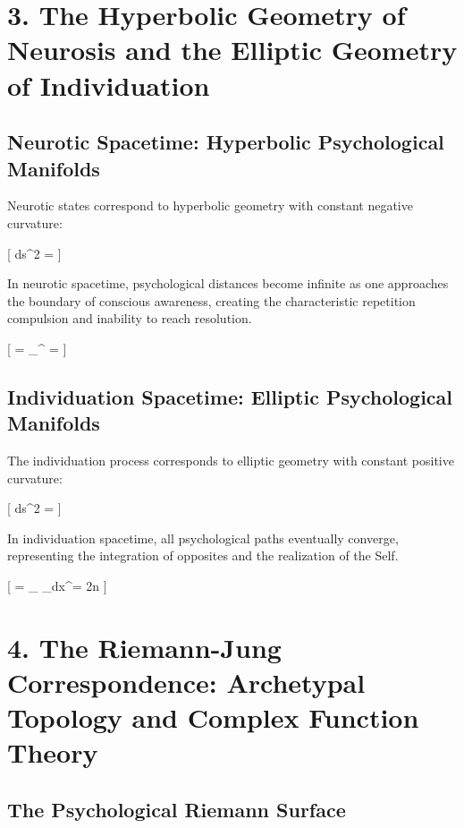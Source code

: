 \documentclass[12pt]{article}
\begin{document}
\section*{3. The Hyperbolic Geometry of Neurosis and the Elliptic Geometry of Individuation}

\subsection*{Neurotic Spacetime: Hyperbolic Psychological Manifolds}

Neurotic states correspond to hyperbolic geometry with constant negative curvature:

[
ds^2 =  \quad {}
]

In neurotic spacetime, psychological distances become infinite as one approaches the boundary of conscious awareness, creating the characteristic repetition compulsion and inability to reach resolution.

[
 = \int_{}^{}  = \infty
]

\subsection*{Individuation Spacetime: Elliptic Psychological Manifolds}

The individuation process corresponds to elliptic geometry with constant positive curvature:

[
ds^2 =  \quad {}
]

In individuation spacetime, all psychological paths eventually converge, representing the integration of opposites and the realization of the Self.

[
 = \oint_{} _\mu dx^\mu = 2\pi n \quad {}
]

\section*{4. The Riemann-Jung Correspondence: Archetypal Topology and Complex Function Theory}

\subsection*{The Psychological Riemann Surface}
\end{document}
